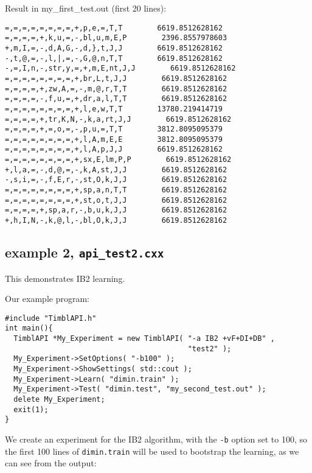Result in my\_first\_test.out (first 20 lines):
\begin{footnotesize}
\begin{verbatim}
=,=,=,=,=,=,=,=,+,p,e,=,T,T        6619.8512628162
=,=,=,=,+,k,u,=,-,bl,u,m,E,P        2396.8557978603
+,m,I,=,-,d,A,G,-,d,},t,J,J        6619.8512628162
-,t,@,=,-,l,|,=,-,G,@,n,T,T        6619.8512628162
-,=,I,n,-,str,y,=,+,m,E,nt,J,J        6619.8512628162
=,=,=,=,=,=,=,=,+,br,L,t,J,J        6619.8512628162
=,=,=,=,+,zw,A,=,-,m,@,r,T,T        6619.8512628162
=,=,=,=,-,f,u,=,+,dr,a,l,T,T        6619.8512628162
=,=,=,=,=,=,=,=,+,l,e,w,T,T        13780.219414719
=,=,=,=,+,tr,K,N,-,k,a,rt,J,J        6619.8512628162
=,=,=,=,+,=,o,=,-,p,u,=,T,T        3812.8095095379
=,=,=,=,=,=,=,=,+,l,A,m,E,E        3812.8095095379
=,=,=,=,=,=,=,=,+,l,A,p,J,J        6619.8512628162
=,=,=,=,=,=,=,=,+,sx,E,lm,P,P        6619.8512628162
+,l,a,=,-,d,@,=,-,k,A,st,J,J        6619.8512628162
-,s,i,=,-,f,E,r,-,st,O,k,J,J        6619.8512628162
=,=,=,=,=,=,=,=,+,sp,a,n,T,T        6619.8512628162
=,=,=,=,=,=,=,=,+,st,o,t,J,J        6619.8512628162
=,=,=,=,+,sp,a,r,-,b,u,k,J,J        6619.8512628162
+,h,I,N,-,k,@,l,-,bl,O,k,J,J        6619.8512628162
\end{verbatim}
\end{footnotesize}

\subsection{example 2, {\tt api\_test2.cxx}}
This demonstrates IB2 learning.

Our example program:

\begin{footnotesize}
\begin{verbatim}
#include "TimblAPI.h"
int main(){
  TimblAPI *My_Experiment = new TimblAPI( "-a IB2 +vF+DI+DB" , 
                                          "test2" );
  My_Experiment->SetOptions( "-b100" );
  My_Experiment->ShowSettings( std::cout );
  My_Experiment->Learn( "dimin.train" );  
  My_Experiment->Test( "dimin.test", "my_second_test.out" );
  delete My_Experiment;
  exit(1);
}
\end{verbatim}
\end{footnotesize}


We create an experiment for the IB2 algorithm, with the {\tt -b} option set
to 100, so the first 100 lines of {\tt dimin.train} will be used to
bootstrap the learning, as we can see from the output:


